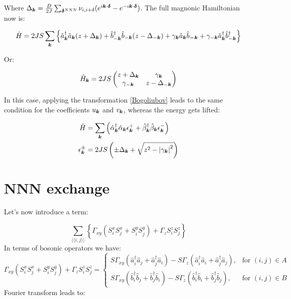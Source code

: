 Where $\Delta_{\boldsymbol{k}} = \frac{D}{2J}\sum_{\boldsymbol{\delta}^{NNN}} \nu_{i,i+\delta} (e^{i\boldsymbol{k}\cdot\boldsymbol{\delta}} -e^{-i\boldsymbol{k}\cdot\boldsymbol{\delta}})$. The full magnonic Hamiltonian now is:

\begin{equation}
\label{MagnonicH2}
\hat{H} = 2JS \sum_{\boldsymbol{k}} \left\{ \hat{a}^\dagger_{\boldsymbol{k}}\hat{a}_{\boldsymbol{k}}(z+\Delta_{\boldsymbol{k}}) + \hat{b}^\dagger_{-\boldsymbol{k}}\hat{b}_{-\boldsymbol{k}}(z-\Delta_{-\boldsymbol{k}}) + \gamma_{\boldsymbol{k}}\hat{a}_{\boldsymbol{k}}\hat{b}_{\boldsymbol{-k}} + \gamma_{-\boldsymbol{k}}\hat{a}^\dagger_{\boldsymbol{k}}\hat{b}^\dagger_{-\boldsymbol{k}} \right\}
\end{equation}

Or:

\begin{equation}
\hat{H}_{\boldsymbol{k}} = 2JS\begin{pmatrix} 
z + \Delta_{\boldsymbol{k}}& \gamma_{\boldsymbol{k}} \\
\gamma_{-\boldsymbol{k}} & z - \Delta_{-\boldsymbol{k}}
\end{pmatrix}
\end{equation}

In this case, applying the transformation \ref{Bogoliubov} leads to the same condition for the coefficients  $u_{\boldsymbol{k}}$ and $v_{\boldsymbol{k}}$, whereas the energy gets lifted:

\begin{align}
\hat{H} &= \sum_{\boldsymbol{k}} \left( \hat{\alpha}_{\boldsymbol{k}}^\dagger \hat{\alpha}_{\boldsymbol{k}} \epsilon_{\boldsymbol{k}}^+ +\hat{\beta}_{\boldsymbol{k}}^\dagger \hat{\beta}_{\boldsymbol{k}}  \epsilon_{\boldsymbol{k}}^- \right) \label{DispWithDMI} \\
\epsilon_{\boldsymbol{k}}^\pm &= 2JS \left( \pm \Delta_{\boldsymbol{k}} + \sqrt{z^2-\abs{\gamma_{\boldsymbol{k}}}^2} \right)
\end{align}

\section{NNN exchange}

Let's now introduce a term:

\begin{equation}
\sum_{\langle \langle i,j \rangle \rangle} \left\{ \Gamma_{xy}(S_i^xS_j^x + S_i^yS_j^y) + \Gamma_zS_i^zS_j^z\right\}
\end{equation}
In terms of bosonic operators we have:
\begin{equation}
\Gamma_{xy}(S_i^xS_j^x + S_i^yS_j^y) + \Gamma_zS_i^zS_j^z = \begin{cases}
             S\Gamma_{xy}(\hat{a}_i^\dagger\hat{a}_j+\hat{a}_j^\dagger\hat{a}_i) - S\Gamma_z(\hat{a}_i^\dagger\hat{a}_i+\hat{a}_j^\dagger\hat{a}_j),  & \text{for } (i,j) \in A \\
             S\Gamma_{xy}(\hat{b}_i^\dagger\hat{b}_j+\hat{b}_j^\dagger\hat{b}_i) - S\Gamma_z(\hat{b}_i^\dagger\hat{b}_i+\hat{b}_j^\dagger\hat{b}_j),  & \text{for } (i,j) \in B
       \end{cases} \quad
\end{equation}
Fourier transform leads to:

